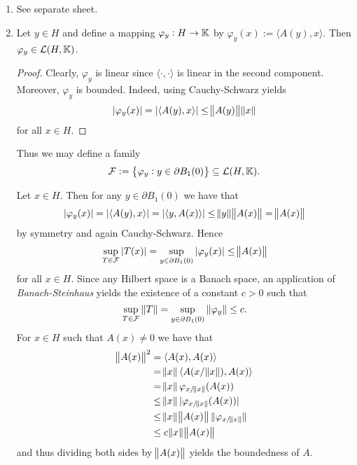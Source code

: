 \begin{enumerate}[label = \textbf{Exercise \arabic*.},wide = 0pt, itemsep = 1.5ex]
	\item See separate sheet.
	\item 
		\begin{lemma}
			Let $y \in H$ and define a mapping $\varphi_y : H \to \mathbb{K}$ by $\varphi_y(x) := \langle A(y),x \rangle$. Then $\varphi_y \in \mathcal{L}(H,\mathbb{K})$.
			\label{lem:family}
		\end{lemma}

		\begin{proof}
			Clearly, $\varphi_y$ is linear since $\langle \cdot,\cdot \rangle$ is linear in the second component. Moreover, $\varphi_y$ is bounded. Indeed, using Cauchy-Schwarz yields
			\begin{equation*}
				\abs[0]{\varphi_y(x)} = \abs[0]{\langle A(y), x \rangle} \leq \norm{A(y)} \norm{x}
			\end{equation*}
			\noindent for all $x \in H$.
		\end{proof}

		Thus we may define a family
		\begin{equation*}
			\Fcal := \cbr{\varphi_y : y \in \partial B_1(0)} \subseteq \Lcal(H,\Kbb).
		\end{equation*}

		Let $x \in H$. Then for any $y \in \partial B_1(0)$ we have that
		\begin{equation*}
			\abs[0]{\varphi_y(x)} = \abs[0]{\langle A(y),x \rangle} = \abs[0]{\langle y,A(x) \rangle} \leq \norm{y} \norm{A(x)} = \norm{A(x)}
		\end{equation*}
		\noindent by symmetry and again Cauchy-Schwarz. Hence
		\begin{equation*}
			\sup_{T \in \Fcal}\abs[0]{T(x)} = \sup_{y \in \partial B_1(0)} \abs[0]{\varphi_y(x)} \leq \norm{A (x)}
		\end{equation*}
		\noindent for all $x \in H$. Since any Hilbert space is a Banach space, an application of \emph{Banach-Steinhaus} yields the existence of a constant $c > 0$ such that
		\begin{equation*}
			\sup_{T \in \Fcal}\norm[0]{T} = \sup_{y \in \partial B_1(0)} \norm[0]{\varphi_y} \leq c.
		\end{equation*}
		For $x \in H$ such that $A(x) \neq 0$ we have that
		\begin{align*}
			\norm{A(x)}^2 &= \langle A(x),A(x) \rangle\\
			&= \norm{x} \langle A(x / \norm{x}), A(x)\rangle\\
			&= \norm{x} \varphi_{x/\norm{x}}(A(x))\\
			&\leq \norm{x} \abs[0]{\varphi_{x/\norm{x}}(A(x))}\\
			&\leq \norm{x} \norm{A(x)} \norm[0]{\varphi_{x/\norm{x}}}\\
			&\leq c\norm{x} \norm{A(x)}
		\end{align*}
		\noindent and thus dividing both sides by $\norm{A(x)}$ yields the boundedness of $A$.


\end{enumerate}
